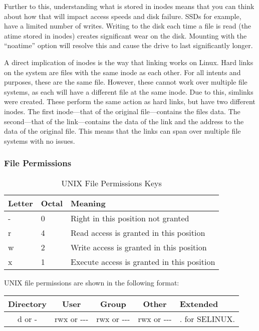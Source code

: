 				Further to this, understanding what is stored in inodes means that you can think about how that will impact access speeds and disk failure.
				SSDs for example, have a limited number of writes.
				Writing to the disk each time a file is read (the atime stored in inodes) creates significant wear on the disk.
				Mounting with the ``noatime'' option will resolve this and cause the drive to last significantly longer.

				A direct implication of inodes is the way that linking works on Linux.
				Hard links on the system are files with the same inode as each other.
				For all intents and purposes, these are the same file.
				However, these cannot work over multiple file systems, as each will have a different file at the same inode.
				Due to this, simlinks were created.
				These perform the same action as hard links, but have two different inodes.
				The first inode---that of the original file---contains the files data.
				The second---that of the link---contains the data of the link and the address to the data of the original file.
				This means that the links can span over multiple file systems with no issues.


			\subsubsection{File Permissions}
				\begin{table}[H]
					\centering
				\begin{adjustbox}{max width=1\textwidth}
					\begin{tabular}{l l l }
						\toprule
						\textbf{Letter} & \textbf{Octal} & \textbf{Meaning} \\
						\toprule
						- & 0 & Right in this position not granted \\
						r & 4 & Read access is granted in this position \\
						w & 2 & Write access is granted in this position \\
						x & 1 & Execute access is granted in this position \\
						\bottomrule
					\end{tabular}
				\end{adjustbox}
					\caption{UNIX File Permissions Keys}
					\label{tab:UNIXPermissionKeys}
				\end{table}
				UNIX file permissions are shown in the following format:
				\begin{center}
				\begin{tabular}{c c c c l }
					\toprule
					\textbf{Directory} & \textbf{User} & \textbf{Group} & \textbf{Other} & \textbf{Extended} \\
					\toprule
					d or - & rwx or -{}-{}- & rwx or -{}-{}- & rwx or -{}-{}- & . for SELINUX. \\
					\bottomrule
				\end{tabular}
				\end{center}


